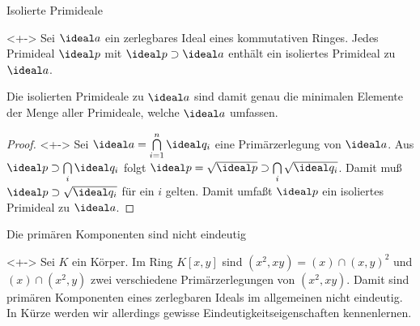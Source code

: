 \begin{frame}{Isolierte Primideale}
	\begin{proposition}<+->
		\label{prop:isolated_prime}
		Sei \(\ideal a\) ein zerlegbares Ideal eines kommutativen Ringes. Jedes Primideal \(\ideal p\) mit \(\ideal p \supset \ideal a\)
		enthält ein isoliertes Primideal zu \(\ideal a\).
	\end{proposition}
	Die isolierten Primideale zu \(\ideal a\) sind damit genau die minimalen Elemente der Menge aller Primideale, welche \(\ideal a\)
	umfassen.
	\begin{proof}<+->
		Sei \(\ideal a = \bigcap\limits_{i = 1}^n \ideal q_i\) eine Primärzerlegung von \(\ideal a\). Aus
		\(\ideal p \supset \bigcap\limits_i \ideal q_i\) folgt \(\ideal p = \sqrt{\ideal p}
		\supset \bigcap\limits_i \sqrt{\ideal q_i}\). Damit muß \(\ideal p \supset \sqrt{\ideal q_i}\) für ein \(i\) gelten.
		Damit umfaßt \(\ideal p\) ein isoliertes Primideal zu \(\ideal a\).
	\end{proof}
\end{frame}

\begin{frame}{Die primären Komponenten sind nicht eindeutig}
	\begin{remark}<+->
		Sei \(K\) ein Körper. Im Ring \(K[x, y]\) sind \((x^2, xy) = (x) \cap (x, y)^2\) und
		\((x) \cap(x^2, y)\) zwei verschiedene Primärzerlegungen von \((x^2, xy)\). Damit sind primären Komponenten
		eines zerlegbaren Ideals im allgemeinen nicht eindeutig.
		\\
		In Kürze werden wir allerdings gewisse Eindeutigkeitseigenschaften kennenlernen.
	\end{remark}
\end{frame}


